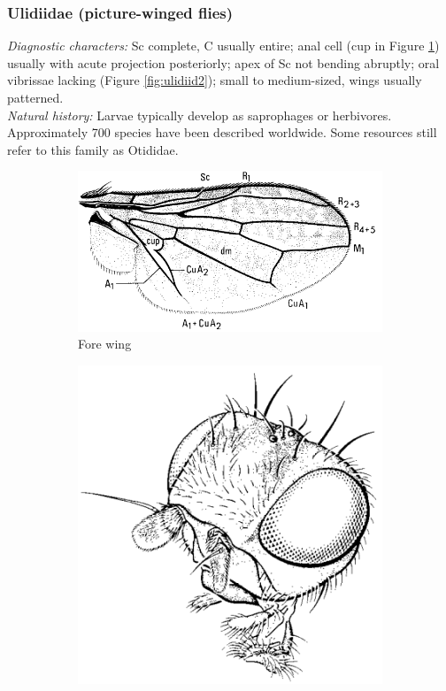 \documentclass[letterpaper, 11pt]{article}
\begin{document}
\subsubsection{Ulidiidae (picture-winged flies)}
\noindent{}\textit{Diagnostic characters:} Sc complete, C usually entire; anal cell (cup in Figure \ref{fig:ulidiid1}) usually with acute projection posteriorly; apex of Sc not bending abruptly; oral vibrissae lacking (Figure \ref{fig:ulidiid2}); small to medium-sized, wings usually patterned.\\

\noindent{}\textit{Natural history:} Larvae typically develop as saprophages or herbivores. Approximately 700 species have been described worldwide. Some resources still refer to this family as Otididae.

\begin{figure}[ht!]
    \centering
    \begin{subfigure}[ht!]{0.47\textwidth}
        \includegraphics[width=\textwidth]{UlidiidWing}
        \caption{Fore wing \citep[][Fig. 63.15]{mcalpine1981manualv2}}
        \label{fig:ulidiid1}
    \end{subfigure}
    \qquad
    \begin{subfigure}[ht!]{0.26\textwidth}
        \includegraphics[width=\textwidth]{UlidiidHead}

\end{subfigure}
\end{figure}
\end{document}
